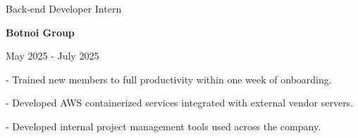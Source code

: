 \documentclass[10pt]{article}
\begin{document}
\begin{minipage}{\textwidth}
        \begin{minipage}{0.725\textwidth}
            \normalsize
            \begingroup
                Back-end Developer Intern\par
                \textbf{Botnoi Group}\par
            \endgroup
        \end{minipage}
        \hfill
        \begin{minipage}{0.185\textwidth}
            \normalsize
            \begingroup
            May 2025 - July 2025
            \endgroup
        \end{minipage}

        \vspace{0.35em}
        \hspace{0.1em}
        \begin{minipage}{0.99\textwidth}
            \normalsize
            \begingroup
            - \hspace{0.5em} Trained new members to full productivity within one week of onboarding.\par
            - \hspace{0.5em} Developed AWS containerized services integrated with external vendor servers.\par
            - \hspace{0.5em} Developed internal project management tools used across the company.\par
            \endgroup
        \end{minipage}
    \end{minipage}

    \vspace{0.85em}
\end{document}
